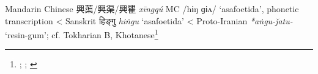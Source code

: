 \begin{etymology}\label{ety:xingqu}
Mandarin Chinese {興蕖/興渠/興瞿} \textit{xīngqú} \gls{MC} /hɨŋ ɡɨʌ/ `asafoetida', phonetic transcription
< Sanskrit {हिङ्गु} \textit{hiṅgu} `asafoetida'
< Proto-Iranian \textit{*aṅgu-ǰatu-} `resin-gum'; cf. Tokharian B, Khotanese\footnote{\textcite{leung_itinerary_2019}; \textcite[353]{laufer_sino-iranica_1919}; \textcite[7]{adams_dictionary_2013}}
\end{etymology}